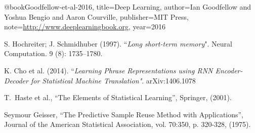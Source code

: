 \begin{thebibliography}{99}
   @book{Goodfellow-et-al-2016,
    title={Deep Learning},
    author={Ian Goodfellow and Yoshua Bengio and Aaron Courville},
    publisher={MIT Press},
    note={\url{http://www.deeplearningbook.org}},
    year={2016}
  }

  S. Hochreiter; J. Schmidhuber (1997). ``{\em Long short-term memory}". Neural Computation. 9 (8): 1735–1780.

K. Cho et al. (2014). ``{\em Learning Phrase Representations using RNN Encoder-Decoder for Statistical Machine Translation"}. arXiv:1406.1078


  
     T.~Haste et al.,
                        ``The Elements of Statistical Learning'',
                        Springer, (2001).

     Seymour Geisser,
                        ``The Predictive Sample Reuse Method with Applications'',
                        Journal of the American Statistical Association,
                        vol. 70:350, p. 320-328, (1975).


\end{thebibliography}
